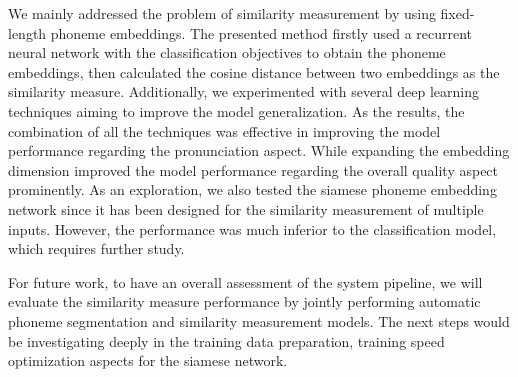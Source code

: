 We mainly addressed the problem of similarity measurement by using fixed-length phoneme embeddings. The presented method firstly used a recurrent neural network with the classification objectives to obtain the phoneme embeddings, then calculated the cosine distance between two embeddings as the similarity measure. Additionally, we experimented with several deep learning techniques aiming to improve the model generalization. As the results, the combination of all the techniques was effective in improving the model performance regarding the pronunciation aspect. While expanding the embedding dimension improved the model performance regarding the overall quality aspect prominently. As an exploration, we also tested the siamese phoneme embedding network since it has been designed for the similarity measurement of multiple inputs. However, the performance was much inferior to the classification model, which requires further study.

For future work, to have an overall assessment of the system pipeline, we will evaluate the similarity measure performance by jointly performing automatic phoneme segmentation and similarity measurement models. The next steps would be investigating deeply in the training data preparation, training speed optimization aspects for the siamese network. 
